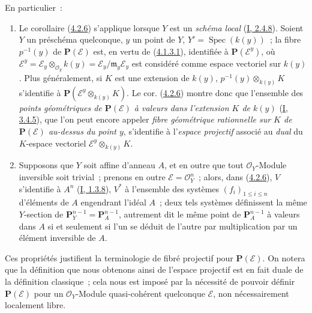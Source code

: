 
En particulier~:
\begin{enumerate}
  \item[1\textsuperscript{o}] Le corollaire
  (\hyperref[II.4.2.6-fr]{4.2.6}) s'applique lorsque $Y$ est un
  \emph{schéma local} (\hyperref[I.2.4.8-fr]{I, 2.4.8}). Soient $Y$ un
  préschéma quelconque, $y$ un point de $Y$,
  $Y'=\operatorname{Spec}(k(y))$~; la fibre $p^{-1}(y)$ de
  $\mathbf{P}(\mathcal{E})$ est, en vertu de
  (\hyperref[II.4.1.3.1-fr]{4.1.3.1}), identifiée à
  $\mathbf{P}(\mathcal{E}^y)$, où
  $\mathcal{E}^y=\mathcal{E}_y\otimes_{\mathcal{O}_y}k(y)
  =\mathcal{E}_y/\mathfrak{m}_y\mathcal{E}_y$ est considéré comme espace
  vectoriel sur $k(y)$. Plus généralement, si $K$ est une extension de
  $k(y)$, $p^{-1}(y)\otimes_{k(y)}K$ s'identifie à
  $\mathbf{P}(\mathcal{E}^y\otimes_{k(y)}K)$. Le cor.
  (\hyperref[II.4.2.6-fr]{4.2.6}) montre donc que l'ensemble des
  \emph{points géométriques de $\mathbf{P}(\mathcal{E})$ à valeurs dans
  l'extension $K$ de $k(y)$} (\hyperref[I.3.4.5-fr]{I, 3.4.5}), que l'on
  peut encore appeler \emph{fibre géométrique rationnelle sur $K$ de
  $\mathbf{P}(\mathcal{E})$ au-dessus du point $y$}, s'identifie à
  l'\emph{espace projectif} associé au \emph{dual} du $K$-espace vectoriel
  $\mathcal{E}^y\otimes_{k(y)}K$.
  \item[2\textsuperscript{o}] Supposons que $Y$ soit affine d'anneau $A$, et
  en outre que tout $\mathcal{O}_Y$-Module inversible soit trivial~; prenons
  en outre $\mathcal{E}=\mathcal{O}_Y^n$~; alors, dans
  (\hyperref[II.4.2.6-fr]{4.2.6}), $V$ s'identifie à $A^n$
  (\hyperref[I.1.3.8-fr]{I, 1.3.8}), $V^*$ à l'ensemble des systèmes
  $(f_i)_{1\leq i\leq n}$ d'éléments de $A$ engendrant l'idéal $A$~; deux
  tels systèmes définissent la même $Y$-section de
  $\mathbf{P}_Y^{n-1}=\mathbf{P}_A^{n-1}$, autrement dit le même point de
  $\mathbf{P}_A^{n-1}$ à valeurs dans $A$ si et seulement si l'un se déduit
  de l'autre par multiplication par un élément inversible de $A$.
\end{enumerate}

Ces propriétés justifient la terminologie de \og fibré projectif\fg{} pour
$\mathbf{P}(\mathcal{E})$. On notera que la définition que nous obtenons
ainsi de l'\og espace projectif\fg{} est en fait duale de la définition
classique~; cela nous est imposé par la nécessité de pouvoir définir
$\mathbf{P}(\mathcal{E})$ pour un $\mathcal{O}_Y$-Module quasi-cohérent
quelconque $\mathcal{E}$, non nécessairement localement libre.

